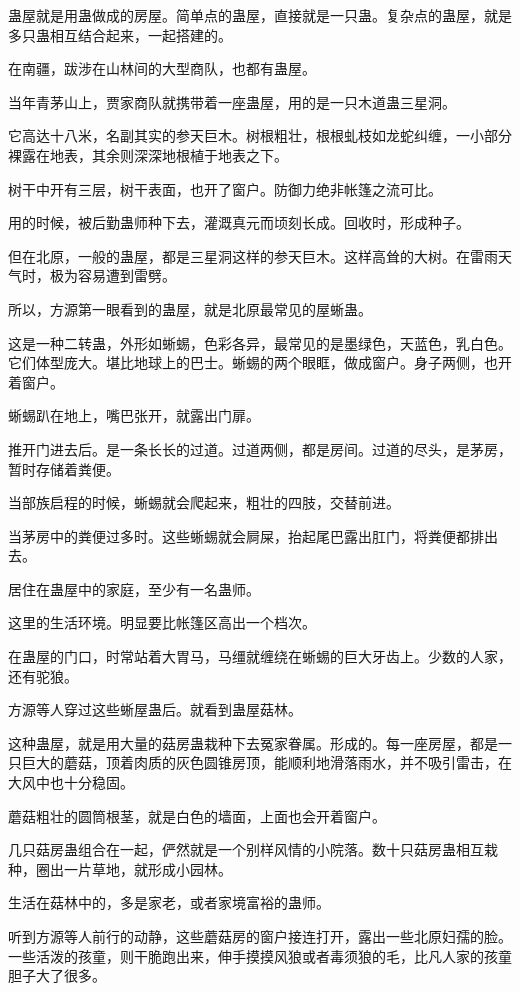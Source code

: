 \begin{this_body}
蛊屋就是用蛊做成的房屋。简单点的蛊屋，直接就是一只蛊。复杂点的蛊屋，就是多只蛊相互结合起来，一起搭建的。

在南疆，跋涉在山林间的大型商队，也都有蛊屋。

当年青茅山上，贾家商队就携带着一座蛊屋，用的是一只木道蛊三星洞。

它高达十八米，名副其实的参天巨木。树根粗壮，根根虬枝如龙蛇纠缠，一小部分裸露在地表，其余则深深地根植于地表之下。

树干中开有三层，树干表面，也开了窗户。防御力绝非帐篷之流可比。

用的时候，被后勤蛊师种下去，灌溉真元而顷刻长成。回收时，形成种子。

但在北原，一般的蛊屋，都是三星洞这样的参天巨木。这样高耸的大树。在雷雨天气时，极为容易遭到雷劈。

所以，方源第一眼看到的蛊屋，就是北原最常见的屋蜥蛊。

这是一种二转蛊，外形如蜥蜴，色彩各异，最常见的是墨绿色，天蓝色，乳白色。它们体型庞大。堪比地球上的巴士。蜥蜴的两个眼眶，做成窗户。身子两侧，也开着窗户。

蜥蜴趴在地上，嘴巴张开，就露出门扉。

推开门进去后。是一条长长的过道。过道两侧，都是房间。过道的尽头，是茅房，暂时存储着粪便。

当部族启程的时候，蜥蜴就会爬起来，粗壮的四肢，交替前进。

当茅房中的粪便过多时。这些蜥蜴就会屙屎，抬起尾巴露出肛门，将粪便都排出去。

居住在蛊屋中的家庭，至少有一名蛊师。

这里的生活环境。明显要比帐篷区高出一个档次。

在蛊屋的门口，时常站着大胃马，马缰就缠绕在蜥蜴的巨大牙齿上。少数的人家，还有驼狼。

方源等人穿过这些蜥屋蛊后。就看到蛊屋菇林。

这种蛊屋，就是用大量的菇房蛊栽种下去冤家眷属。形成的。每一座房屋，都是一只巨大的蘑菇，顶着肉质的灰色圆锥房顶，能顺利地滑落雨水，并不吸引雷击，在大风中也十分稳固。

蘑菇粗壮的圆筒根茎，就是白色的墙面，上面也会开着窗户。

几只菇房蛊组合在一起，俨然就是一个别样风情的小院落。数十只菇房蛊相互栽种，圈出一片草地，就形成小园林。

生活在菇林中的，多是家老，或者家境富裕的蛊师。

听到方源等人前行的动静，这些蘑菇房的窗户接连打开，露出一些北原妇孺的脸。一些活泼的孩童，则干脆跑出来，伸手摸摸风狼或者毒须狼的毛，比凡人家的孩童胆子大了很多。


\end{this_body}

